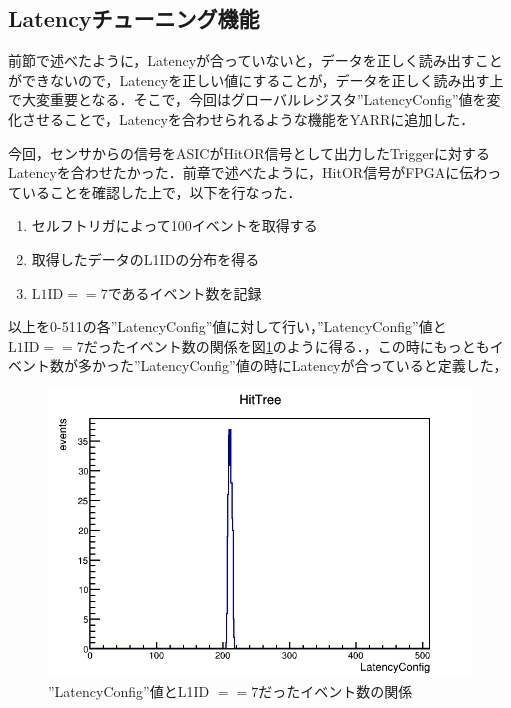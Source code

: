 \subsection{Latencyチューニング機能}
前節で述べたように，Latencyが合っていないと，データを正しく読み出すことができないので，Latencyを正しい値にすることが，データを正しく読み出す上で大変重要となる．そこで，今回はグローバルレジスタ''LatencyConfig''値を変化させることで，Latencyを合わせられるような機能をYARRに追加した．\par
今回，センサからの信号をASICがHitOR信号として出力したTriggerに対するLatencyを合わせたかった．前章で述べたように，HitOR信号がFPGAに伝わっていることを確認した上で，以下を行なった．
\begin{enumerate}
\item セルフトリガによって100イベントを取得する
\item 取得したデータのL1IDの分布を得る
\item $\mathrm{L1ID} == 7$であるイベント数を記録
\end{enumerate}
以上を0-511の各''LatencyConfig''値に対して行い，''LatencyConfig''値と$\mathrm{L1ID} == 7$だったイベント数の関係を図\ref{fig:latencydist}のように得る．，この時にもっともイベント数が多かった''LatencyConfig''値の時にLatencyが合っていると定義した，

\begin{figure}[h]
  \centering
  \includegraphics[width=14cm]{./figure/latencydist.png}
  \caption{''LatencyConfig''値とL1ID $== 7$だったイベント数の関係}
  \label{fig:latencydist}
\end{figure}


